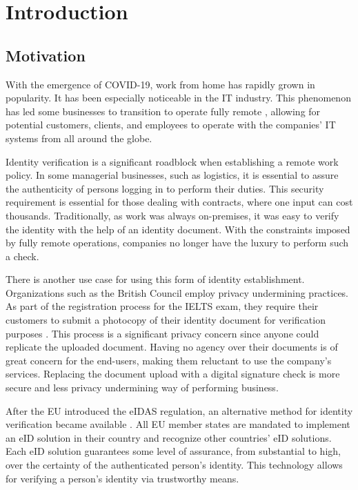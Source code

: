 \section{Introduction}

\subsection{Motivation}

With the emergence of COVID-19, work from home has rapidly grown in popularity. It has been especially noticeable in the IT industry. This phenomenon has led some businesses to transition to operate fully remote \cite{ozimek2020future}, allowing for potential customers, clients, and employees to operate with the companies' IT systems from all around the globe.

Identity verification is a significant roadblock when establishing a remote work policy. In some managerial businesses, such as logistics, it is essential to assure the authenticity of persons logging in to perform their duties. This security requirement is essential for those dealing with contracts, where one input can cost thousands. Traditionally, as work was always on-premises, it was easy to verify the identity with the help of an identity document. With the constraints imposed by fully remote operations, companies no longer have the luxury to perform such a check.

There is another use case for using this form of identity establishment. Organizations such as the British Council employ privacy undermining practices. As part of the registration process for the IELTS exam, they require their customers to submit a photocopy of their identity document for verification purposes \cite{ielts-howtoregister}. This process is a significant privacy concern since anyone could replicate the uploaded document. Having no agency over their documents is of great concern for the end-users, making them reluctant to use the company's services. Replacing the document upload with a digital signature check is more secure and less privacy undermining way of performing business.

After the EU introduced the eIDAS regulation, an alternative method for identity verification became available \cite{eulaw-eidas}. All EU member states are mandated to implement an eID solution in their country and recognize other countries' eID solutions. Each eID solution guarantees some {level of assurance}, from substantial to high, over the certainty of the authenticated person's identity. This technology allows for verifying a person's identity via trustworthy means.

